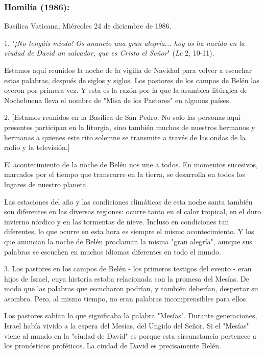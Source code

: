 \begin{body}
\subsubsection{Homilía (1986): }

Basílica Vaticana, Miércoles 24 de diciembre de 1986.

\begin{body} 
1. "\emph{¡No tengáis miedo! Os anuncio una gran alegría... hoy os ha nacido en la ciudad de David un salvador, que es Cristo el Señor}" (\emph{Lc} 2, 10-11).

Estamos aquí reunidos la noche de la vigilia de Navidad para volver a escuchar estas palabras, después de siglos y siglos. Los pastores de los campos de Belén las oyeron por primera vez. Y esta es la razón por la que la asamblea litúrgica de Nochebuena lleva el nombre de "Misa de los Pastores" en algunos países.

2. {[}Estamos reunidos en la Basílica de San Pedro. No solo las personas aquí presentes participan en la liturgia, sino también muchos de nuestros hermanos y hermanas a quienes este rito solemne se transmite a través de las ondas de la radio y la televisión.{]}

El acontecimiento de la noche de Belén nos une a todos. En momentos sucesivos, marcados por el tiempo que transcurre en la tierra, se desarrolla en todos los lugares de nuestro planeta.

Las estaciones del año y las condiciones climáticas de esta noche santa también son diferentes en las diversas regiones: ocurre tanto en el calor tropical, en el duro invierno nórdico y en las tormentas de nieve. Incluso en condiciones tan diferentes, lo que ocurre en esta hora es siempre el mismo acontecimiento. Y los que anuncian la noche de Belén proclaman la misma "gran alegría", aunque sus palabras se escuchen en muchos idiomas diferentes en todo el mundo.

3. Los pastores en los campos de Belén - los primeros testigos del evento - eran hijos de Israel, cuya historia estaba relacionada con la promesa del Mesías. De modo que las palabras que escucharon podrían, y también deberían, despertar su asombro. Pero, al mismo tiempo, no eran palabras incomprensibles para ellos.

Los pastores sabían lo que significaba la palabra "Mesías". Durante generaciones, Israel había vivido a la espera del Mesías, del Ungido del Señor. Si el "Mesías" viene al mundo en la "ciudad de David" es porque esta circunstancia pertenece a los pronósticos proféticos. La ciudad de David es precisamente Belén.


\end{body}
\end{body}
